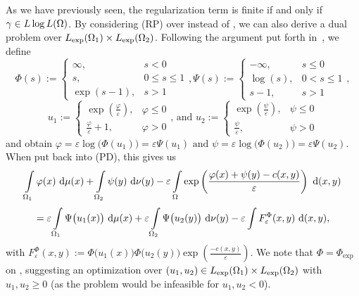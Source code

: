 As we have previously seen, the regularization term is finite if and only if $\gamma \in \LLL$. By considering (RP) over \LLL{} instead of \TP{\mu}{\nu}, we can also derive a dual problem over $\Lexp[\Omega_1] \times \Lexp[\Omega_2]$. Following the argument put forth in\ \cite[Section~4]{Cla2021}, we define
\[ \Phi(s) := \begin{cases}
	\infty, & s < 0 \\
	s, & 0 \le s \le 1 \\
	\exp(s - 1), & s > 1
\end{cases}, \Psi(s) := \begin{cases}
	- \infty, & s \le 0 \\
	\log(s), & 0 < s \le 1 \\
	s - 1, & s > 1
\end{cases}, \]
\[ u_1 := \begin{cases}
	\exp \left( \frac{\varphi}{\varepsilon} \right), & \varphi \le 0 \\
	\frac{\varphi}{\varepsilon} + 1, & \varphi > 0
\end{cases} \text{, and } u_2 := \begin{cases}
	\exp \left( \frac{\psi}{\varepsilon} \right), & \psi \le 0 \\
	\frac{\psi}{\varepsilon}, & \psi > 0
\end{cases} \]
and obtain $\varphi = \varepsilon \log \big( \Phi(u_1) \big) = \varepsilon \Psi(u_1) \text{ and } \psi = \varepsilon \log \big( \Phi(u_2) \big) = \varepsilon \Psi(u_2)$. When put back into (PD), this gives us
\[ \int\limits_{\Omega_1} \varphi(x)~\Dx{\mu} + \int\limits_{\Omega_2} \psi(y)~\Dx[y]{\nu} - \varepsilon \int\limits_{\Omega} \exp \left( \frac{\varphi(x) + \psi(y) - c(x, y)}{\varepsilon} \right)~\Dx[x, y]{} \]
\[ = \varepsilon \int\limits_{\Omega_1} \Psi\big( u_1(x) \big)~\Dx{\mu} + \varepsilon \int\limits_{\Omega_2} \Psi\big( u_2(y) \big)~\Dx[y]{\nu} - \varepsilon \int\limits F_{\varepsilon}^{\Phi}(x, y)~\Dx[x, y]{}, \]
with $F_{\varepsilon}^{\Phi}(x, y) := \Phi\big( u_1(x) \big) \Phi\big( u_2(y) \big) \exp\left( \frac{-c(x, y)}{\varepsilon} \right)$. We note that $\Phi = \Phi_{\exp}$ on \RZero, suggesting an optimization over ${(u_1, u_2)} \in \Lexp[\Omega_1] \times \Lexp[\Omega_2]$ with $u_1, u_2 \ge 0$ (as the problem would be infeasible for $u_1, u_2 < 0$).


